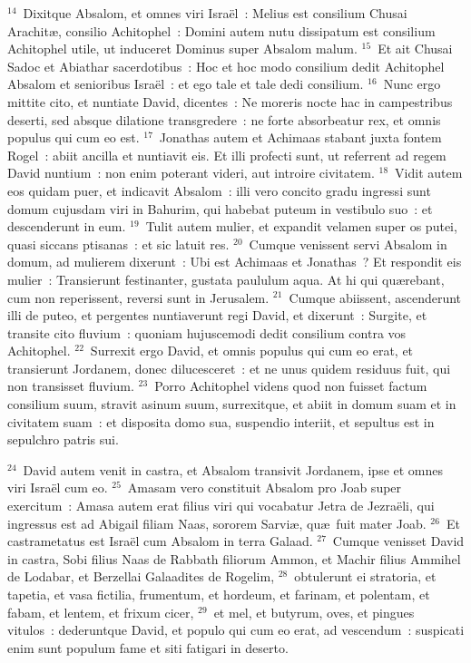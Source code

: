 ${}^{14}$~Dixitque Absalom, et omnes viri Isra\"el~: Melius est consilium Chusai Arachit\ae , consilio Achitophel~: Domini autem nutu dissipatum est consilium Achitophel utile, ut induceret Dominus super Absalom malum.
${}^{15}$~Et ait Chusai Sadoc et Abiathar sacerdotibus~: Hoc et hoc modo consilium dedit Achitophel Absalom et senioribus Isra\"el~: et ego tale et tale dedi consilium.
${}^{16}$~Nunc ergo mittite cito, et nuntiate David, dicentes~: Ne moreris nocte hac in campestribus deserti, sed absque dilatione transgredere~: ne forte absorbeatur rex, et omnis populus qui cum eo est.
${}^{17}$~Jonathas autem et Achimaas stabant juxta fontem Rogel~: abiit ancilla et nuntiavit eis. Et illi profecti sunt, ut referrent ad regem David nuntium~: non enim poterant videri, aut introire civitatem.
${}^{18}$~Vidit autem eos quidam puer, et indicavit Absalom~: illi vero concito gradu ingressi sunt domum cujusdam viri in Bahurim, qui habebat puteum in vestibulo suo~: et descenderunt in eum.
${}^{19}$~Tulit autem mulier, et expandit velamen super os putei, quasi siccans ptisanas~: et sic latuit res.
${}^{20}$~Cumque venissent servi Absalom in domum, ad mulierem dixerunt~: Ubi est Achimaas et Jonathas~? Et respondit eis mulier~: Transierunt festinanter, gustata paululum aqua. At hi qui qu\ae rebant, cum non reperissent, reversi sunt in Jerusalem.
${}^{21}$~Cumque abiissent, ascenderunt illi de puteo, et pergentes nuntiaverunt regi David, et dixerunt~: Surgite, et transite cito fluvium~: quoniam hujuscemodi dedit consilium contra vos Achitophel.
${}^{22}$~Surrexit ergo David, et omnis populus qui cum eo erat, et transierunt Jordanem, donec dilucesceret~: et ne unus quidem residuus fuit, qui non transisset fluvium.
${}^{23}$~Porro Achitophel videns quod non fuisset factum consilium suum, stravit asinum suum, surrexitque, et abiit in domum suam et in civitatem suam~: et disposita domo sua, suspendio interiit, et sepultus est in sepulchro patris sui.


${}^{24}$~David autem venit in castra, et Absalom transivit Jordanem, ipse et omnes viri Isra\"el cum eo.
${}^{25}$~Amasam vero constituit Absalom pro Joab super exercitum~: Amasa autem erat filius viri qui vocabatur Jetra de Jezra\"eli, qui ingressus est ad Abigail filiam Naas, sororem Sarvi\ae , qu\ae\ fuit mater Joab.
${}^{26}$~Et castrametatus est Isra\"el cum Absalom in terra Galaad.
${}^{27}$~Cumque venisset David in castra, Sobi filius Naas de Rabbath filiorum Ammon, et Machir filius Ammihel de Lodabar, et Berzellai Galaadites de Rogelim,
${}^{28}$~obtulerunt ei stratoria, et tapetia, et vasa fictilia, frumentum, et hordeum, et farinam, et polentam, et fabam, et lentem, et frixum cicer,
${}^{29}$~et mel, et butyrum, oves, et pingues vitulos~: dederuntque David, et populo qui cum eo erat, ad vescendum~: suspicati enim sunt populum fame et siti fatigari in deserto.

